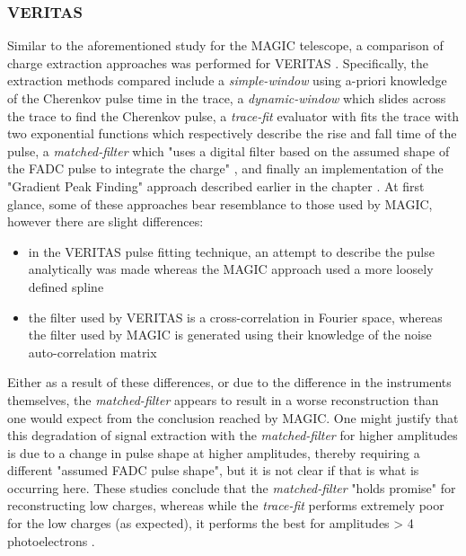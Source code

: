 \subsubsection{VERITAS}

Similar to the aforementioned study for the MAGIC telescope, a comparison of charge extraction approaches was performed for VERITAS \cite{Holder2005}\cite{Cogan2006}\cite{Cogan2007}. Specifically, the extraction methods compared include a \textit{simple-window} using a-priori knowledge of the Cherenkov pulse time in the trace, a \textit{dynamic-window} which slides across the trace to find the Cherenkov pulse, a \textit{trace-fit} evaluator with fits the trace with two exponential functions which respectively describe the rise and fall time of the pulse, a \textit{matched-filter} which "uses a digital filter based on the assumed shape of the FADC pulse to integrate the charge" \cite{Cogan2007}, and finally an implementation of the "Gradient Peak Finding" approach described earlier in the chapter . At first glance, some of these approaches bear resemblance to those used by MAGIC, however there are slight differences: 
\begin{itemize}
	\item in the VERITAS pulse fitting technique, an attempt to describe the pulse analytically was made whereas the MAGIC approach used a more loosely defined spline
	\item the filter used by VERITAS is a cross-correlation in Fourier space, whereas the filter used by MAGIC is generated using their knowledge of the noise auto-correlation matrix
\end{itemize}

Either as a result of these differences, or due to the difference in the instruments themselves, the \textit{matched-filter} appears to result in a worse reconstruction than one would expect from the conclusion reached by MAGIC. One might justify that this degradation of signal extraction with the \textit{matched-filter} for higher amplitudes is due to a change in pulse shape at higher amplitudes, thereby requiring a different "assumed FADC pulse shape", but it is not clear if that is what is occurring here. These studies conclude that the \textit{matched-filter} "holds promise" for reconstructing low charges, whereas while the \textit{trace-fit} performs extremely poor for the low charges (as expected), it performs the best for amplitudes > 4 photoelectrons \cite{Cogan2007}.

